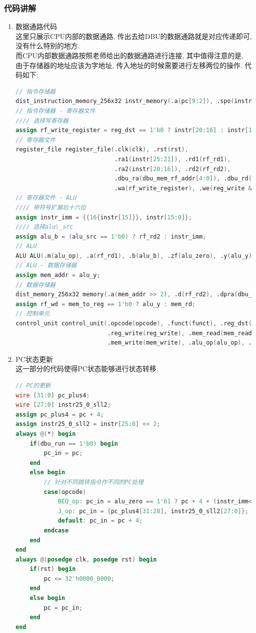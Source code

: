 \documentclass[UTF8]{article}
\begin{document}
\subsubsection{代码讲解}
\begin{enumerate}
	\item 数据通路代码\\
	这里只展示CPU内部的数据通路, 传出去给DBU的数据通路就是对应传递即可, 没有什么特别的地方.\\
	而CPU内部数据通路按照老师给出的数据通路进行连接, 其中值得注意的是, 由于存储器的地址应该为字地址, 传入地址的时候需要进行左移两位的操作. 代码如下:
	\begin{lstlisting}[language=verilog]
// 指令存储器
dist_instruction_memory_256x32 instr_memory(.a(pc[9:2]), .spo(instr));
// 指令存储器 - 寄存器文件
//// 选择写寄存器
assign rf_write_register = reg_dst == 1'b0 ? instr[20:16] : instr[15:11];
// 寄存器文件
register_file register_file(.clk(clk), .rst(rst),
                            .ra1(instr[25:21]), .rd1(rf_rd1),
                            .ra2(instr[20:16]), .rd2(rf_rd2),
                            .dbu_ra(dbu_mem_rf_addr[4:0]), .dbu_rd(dbu_rf_data),
                            .wa(rf_write_register), .we(reg_write & dbu_run), .wd(rf_wd));
// 寄存器文件 - ALU
//// 带符号扩展后十六位
assign instr_imm = {{16{instr[15]}}, instr[15:0]};
//// 选择alu\_src
assign alu_b = (alu_src == 1'b0) ? rf_rd2 : instr_imm;
// ALU
ALU ALU(.m(alu_op), .a(rf_rd1), .b(alu_b), .zf(alu_zero), .y(alu_y));
// ALU - 数据存储器
assign mem_addr = alu_y;
// 数据存储器
dist_memory_256x32 memory(.a(mem_addr >> 2), .d(rf_rd2), .dpra(dbu_mem_rf_addr), .clk(clk), .we(mem_write & dbu_run), .spo(mem_rd), .dpo(dbu_mem_data));
assign rf_wd = mem_to_reg == 1'b0 ? alu_y : mem_rd;
// 控制单元
control_unit control_unit(.opcode(opcode), .funct(funct), .reg_dst(reg_dst),
						  .reg_write(reg_write), .mem_read(mem_read),.mem_to_reg(mem_to_reg),
						  .mem_write(mem_write), .alu_op(alu_op), .alu_src(alu_src));
	\end{lstlisting}
	
	\item PC状态更新\\
	这一部分的代码使得PC状态能够进行状态转移.
	\begin{lstlisting}[language=verilog]
// PC的更新
wire [31:0] pc_plus4;
wire [27:0] instr25_0_sll2;
assign pc_plus4 = pc + 4;
assign instr25_0_sll2 = instr[25:0] << 2;
always @(*) begin
    if(dbu_run == 1'b0) begin
        pc_in = pc;
    end
    else begin
    	// 针对不同跳转指令作不同的PC处理
        case(opcode)
            BEQ_op: pc_in = alu_zero == 1'b1 ? pc + 4 + (instr_imm<<2) : pc + 4;
            J_op: pc_in = {pc_plus4[31:28], instr25_0_sll2[27:0]};
            default: pc_in = pc + 4;
        endcase
    end
end
always @(posedge clk, posedge rst) begin
    if(rst) begin
        pc <= 32'h0000_0000;
    end
    else begin
        pc = pc_in;
    end
end
	\end{lstlisting}
	

\end{enumerate}
\end{document}
